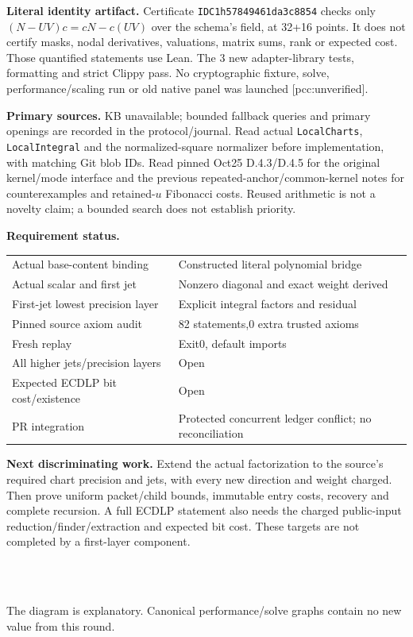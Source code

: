 \documentclass[10pt]{article}
\begin{document}
\textbf{Literal identity artifact.} Certificate
\texttt{IDC1h57849461da3c8854} checks only
$(N-UV)c=cN-c(UV)$ over the schema's field, at 32+16 points. It does not
certify masks, nodal derivatives, valuations, matrix sums, rank or expected
cost. Those quantified statements use Lean. The 3 new adapter-library tests,
formatting and strict Clippy pass. No cryptographic fixture, solve,
performance/scaling run or old native panel was launched [pcc:unverified].

\textbf{Primary sources.} KB unavailable; bounded fallback queries and
primary openings are recorded in the protocol/journal. Read actual
\texttt{LocalCharts}, \texttt{LocalIntegral} and the normalized-square
normalizer before implementation, with matching Git blob IDs. Read pinned
Oct25 D.4.3/D.4.5 for the original kernel/mode interface and the previous
repeated-anchor/common-kernel notes for counterexamples and retained-$u$
Fibonacci costs. Reused arithmetic is not a novelty claim; a bounded search
does not establish priority.

\textbf{Requirement status.}
\begin{center}
\begin{tabular}{p{.38\linewidth}p{.53\linewidth}}
Actual base-content binding & Constructed literal polynomial bridge\\
Actual scalar and first jet & Nonzero diagonal and exact weight derived\\
First-jet lowest precision layer & Explicit integral factors and residual\\
Pinned source axiom audit &82 statements,0 extra trusted axioms\\
Fresh replay &Exit0, default imports\\
All higher jets/precision layers &Open\\
Expected ECDLP bit cost/existence &Open\\
PR integration &Protected concurrent ledger conflict; no reconciliation\\
\end{tabular}
\end{center}

\textbf{Next discriminating work.} Extend the actual factorization to the
source's required chart precision and jets, with every new direction and
weight charged. Then prove uniform packet/child bounds, immutable entry
costs, recovery and complete recursion. A full ECDLP statement also needs
the charged public-input reduction/finder/extraction and expected bit cost.
These targets are not completed by a first-layer component.

\\
\\

The diagram is explanatory. Canonical performance/solve graphs contain no
new value from this round.
\end{document}
